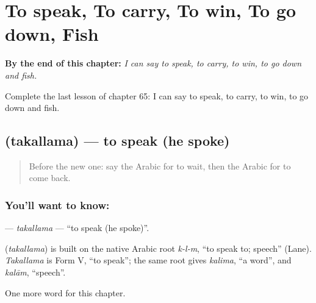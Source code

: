 
\chapter{To speak, To carry, To win, To go down, Fish}
\label{ch:ar-to-speak-to-carry-to-win-to-go-down-fish}

\begin{chapteropening}
\textbf{By the end of this chapter:} \emph{I can say to speak, to carry, to win, to go down and fish.}

Complete the last lesson of chapter 65: I can say to speak, to carry, to win, to go down and fish.
\end{chapteropening}

\section[\texorpdfstring{\ar{تكلم} (takallama)}{تكلم (takallama)}]{ (takallama) — to speak (he spoke)}

\label{lesson:AR-C65-takallama}



\begin{quote}
Before the new one: say the Arabic for to wait, then the Arabic for to come back.
\end{quote}

\subsection*{You'll want to know: }
\textbf{} — \emph{takallama} — \textquotedblleft{}to speak (he spoke)\textquotedblright{}.

\begin{cousinweb}
\textbf{} (\emph{takallama}) is built on the native Arabic root \emph{k-l-m}, \textquotedblleft{}to speak to; speech\textquotedblright{} (Lane). \emph{Takallama} is Form V, \textquotedblleft{}to speak\textquotedblright{}; the same root gives \emph{kalima}, \textquotedblleft{}a word\textquotedblright{}, and \emph{kalām}, \textquotedblleft{}speech\textquotedblright{}.
\end{cousinweb}

\begin{grammarlens}[title={What you've built}]
One more word for this chapter.
\end{grammarlens}

